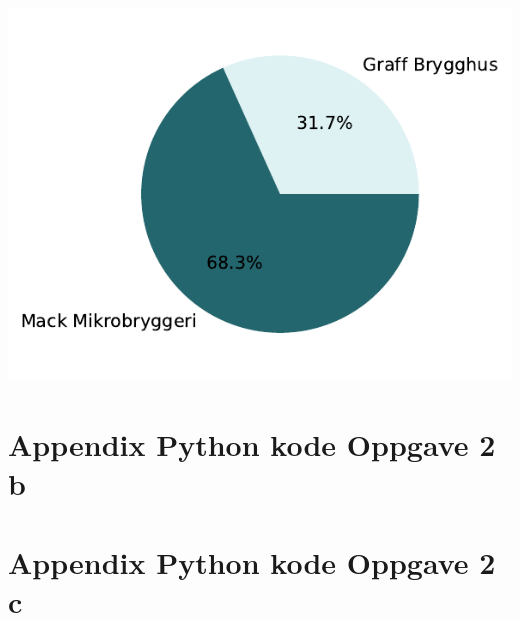 \documentclass[
  12pt,
  a4paper,
  DIV=11,
  numbers=noendperiod]{scrartcl}
\begin{document}
\includegraphics{18_SOK2030_mappeoppgave_2_V24_files/figure-pdf/cell-40-output-1.pdf}

\clearpage

\section {Appendix Python kode Oppgave 2 b}

\clearpage

\section {Appendix Python kode Oppgave 2 c}
\end{document}
